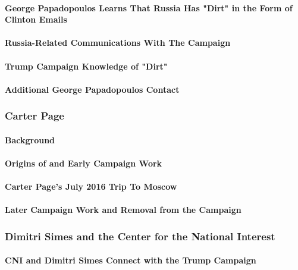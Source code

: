 \paragraph{George Papadopoulos Learns That Russia Has "Dirt" in the Form of Clinton Emails}

\paragraph{Russia-Related Communications With The Campaign}

\paragraph{Trump Campaign Knowledge of "Dirt"}

\paragraph{Additional George Papadopoulos Contact}

\subsubsection{Carter Page}

\paragraph{Background}

\paragraph{Origins of and Early Campaign Work}

\paragraph{Carter Page's July 2016 Trip To Moscow}

\paragraph{Later Campaign Work and Removal from the Campaign}

\subsubsection{Dimitri Simes and the Center for the National Interest}

\paragraph{CNI and Dimitri Simes Connect with the Trump Campaign}

